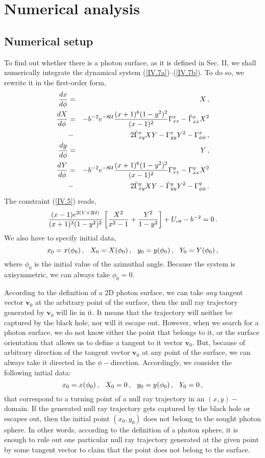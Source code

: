 \documentclass[twocolumn,showpacs,preprintnumbers,amsmath,amssymb,floatfix,nofootinbib]{revtex4-1}
\newcommand{\be}{\begin{equation}}
\newcommand{\ee}{\end{equation}}
\newcommand{\ba}{\begin{eqnarray}}
\newcommand{\ea}{\end{eqnarray}}
\newcommand{\non}{\nonumber}
\newcommand{\eq}[1]{(\ref{#1})}
\newcommand{\n}[1]{\label{#1}}
\newcommand{\hh}{\hspace{0.25cm}}
\newcommand{\ind}[1]{\mbox{\tiny #1}}
\newcommand{\cu}{{\cal U}}
\begin{document}
\section{Numerical analysis} 

\subsection{Numerical setup}

To find out whether there is a photon surface, as it is defined in Sec. II, we shall numerically integrate the dynamical system \eq{IV.7a}--\eq{IV.7b}. To do so, we rewrite it in the first-order form,
\ba
\frac{dx}{d\phi}&=&X\,,\n{VI.1}\\
\frac{dX}{d\phi}&=&-b^{-2}e^{-8\cu}\frac{(x+1)^6(1-y^2)^2}{(x-1)^2}\Gamma^{x}_{\tau\tau}-\tilde{\Gamma}^{x}_{xx}X^2\non\\
&-&2\tilde{\Gamma}^{x}_{xy}XY-\Gamma^{x}_{yy}Y^2-\Gamma^{x}_{\phi\phi}\,,\n{VI.2}\\
\frac{dy}{d\phi}&=&Y\,,\n{VI.3}\\
\frac{dY}{d\phi}&=&-b^{-2}e^{-8\cu}\frac{(x+1)^6(1-y^2)^2}{(x-1)^2}\Gamma^{y}_{\tau\tau}-\Gamma^{y}_{xx}X^2\non\\
&-&2\tilde{\Gamma}^{y}_{xy}XY-\tilde{\Gamma}^{y}_{yy}Y^2-\Gamma^{y}_{\phi\phi}\,.\n{VI.4}
\ea
The constraint \eq{IV.5} reads,
\be\n{VI.5}
\frac{(x-1)e^{2(V+2\cu)}}{(x+1)^3(1-y^2)^2}\left[\frac{X^2}{x^{2}-1}+\frac{Y^2}{1-y^{2}}\right]+U_{\ind{eff}}-b^{-2}=0\,.
\ee 
We also have to specify initial data,
\be\n{VI.6}
x_0=x(\phi_0)\,,\hh X_0=X(\phi_0)\,,\hh y_0=y(\phi_0)\,,\hh Y_0=Y(\phi_0)\,,
\ee
where $\phi_0$ is the initial value of the azimuthal angle. Because the system is axisymmetric, we can always take $\phi_0=0$. 

According to the definition of a 2D photon surface, we can take {\em any} tangent vector ${\bm v}_0$ at the arbitrary point of the surface, then the null ray trajectory generated by ${\bm v}_0$ will lie in it. It means that the trajectory will neither be captured by the black hole, nor will it escape out. However, when we search for a photon surface, we do not know either the point that belongs to it, or the surface orientation that allows us to define a tangent to it vector ${\bm v}_0$. But, because of arbitrary direction of the tangent vector ${\bm v}_0$ at any point of the surface, we can always take it directed in the $\phi-$direction. Accordingly, we consider the following initial data:
\be\n{VI.7}
x_0=x(\phi_0)\,,\hh X_0=0\,,\hh y_0=y(\phi_0)\,,\hh Y_0=0\,,
\ee
that correspond to a turning point of a null ray trajectory in an $(x,y)-$domain. If the generated null ray trajectory gets captured by the black hole or escapes out, then the initial point $(x_0,y_0)$ does not belong to the sought photon sphere. In other words, according to the definition of a photon sphere, it is enough to rule out one particular null ray trajectory generated at the given point by some tangent vector to claim that the point does not belong to the surface.       
\end{document}
